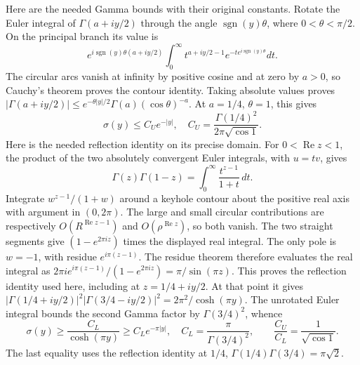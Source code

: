 \documentclass[11pt,a4paper]{article}
\begin{document}
Here are the needed Gamma bounds with their original constants.
Rotate the Euler integral of $\Gamma(a+iy/2)$ through the angle
$\operatorname{sgn}(y)\theta$, where $0<\theta<\pi/2$.
On the principal branch its value is
\[
 e^{i\operatorname{sgn}(y)\theta(a+iy/2)}
 \int_0^\infty t^{a+iy/2-1}
                  e^{-t e^{i\operatorname{sgn}(y)\theta}}dt.
\]
The circular arcs vanish at infinity by positive cosine and
at zero by $a>0$, so Cauchy's theorem proves the contour
identity. Taking absolute values proves
$|\Gamma(a+iy/2)|\leq e^{-\theta|y|/2}
\Gamma(a)(\cos\theta)^{-a}$. At $a=1/4$, $\theta=1$, this gives
\[
 \sigma(y)\leq C_Ue^{-|y|},\quad
 C_U=\frac{\Gamma(1/4)^2}{2\pi\sqrt{\cos1}}.
\tag{BRD23}
\]
Here is the needed reflection identity on its precise domain.
For $0<\operatorname{Re}z<1$, the product of the two absolutely
convergent Euler integrals, with $u=tv$, gives
\[
 \Gamma(z)\Gamma(1-z)=\int_0^\infty\frac{t^{z-1}}{1+t}\,dt.
\]
Integrate $w^{z-1}/(1+w)$ around a keyhole contour about the
positive real axis with argument in $(0,2\pi)$. The large and
small circular contributions are respectively
$O(R^{\operatorname{Re}z-1})$ and
$O(\rho^{\operatorname{Re}z})$, so both vanish. The two straight
segments give $(1-e^{2\pi iz})$ times the displayed real integral.
The only pole is $w=-1$, with residue $e^{i\pi(z-1)}$. The
residue theorem therefore evaluates the real integral as
$2\pi i e^{i\pi(z-1)}/(1-e^{2\pi iz})=\pi/\sin(\pi z)$.
This proves the reflection identity used here, including at
$z=1/4+iy/2$. At that point it gives
$|\Gamma(1/4+iy/2)|^2|\Gamma(3/4-iy/2)|^2
=2\pi^2/\cosh(\pi y)$.
The unrotated Euler integral bounds the second Gamma factor
by $\Gamma(3/4)^2$, whence
\[
 \sigma(y)\geq\frac{C_L}{\cosh(\pi y)}
       \geq C_Le^{-\pi|y|},\quad
 C_L=\frac{\pi}{\Gamma(3/4)^2},\qquad
 \frac{C_U}{C_L}=\frac1{\sqrt{\cos1}}.
\tag{BRD24}
\]
The last equality uses the reflection identity at $1/4$,
$\Gamma(1/4)\Gamma(3/4)=\pi\sqrt2$.
\end{document}
